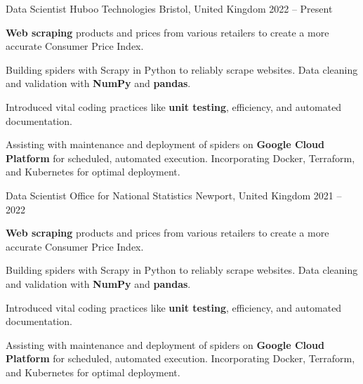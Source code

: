 
\begin{cventries}

        \cventry
        {Data Scientist} %
        {Huboo Technologies} %
        {Bristol, United Kingdom} %
        {2022 -- Present} %
        {
            \begin{cvitems} %
                \item{\textbf{Web scraping} products and prices from various retailers to create a more accurate Consumer Price Index.}
                \item{Building spiders with Scrapy in Python to reliably scrape websites. Data cleaning and validation with \textbf{NumPy} and \textbf{pandas}.}
                \item{Introduced vital coding practices like \textbf{unit testing}, efficiency, and automated documentation.}
                \item{Assisting with maintenance and deployment of spiders on \textbf{Google Cloud Platform} for scheduled, automated execution. Incorporating Docker, Terraform, and Kubernetes for optimal deployment.}
            \end{cvitems}
        }

    \cventry
        {Data Scientist} %
        {Office for National Statistics} %
        {Newport, United Kingdom} %
        {2021 -- 2022} %
        {
            \begin{cvitems} %
                \item{\textbf{Web scraping} products and prices from various retailers to create a more accurate Consumer Price Index.}
                \item{Building spiders with Scrapy in Python to reliably scrape websites. Data cleaning and validation with \textbf{NumPy} and \textbf{pandas}.}
                \item{Introduced vital coding practices like \textbf{unit testing}, efficiency, and automated documentation.}
                \item{Assisting with maintenance and deployment of spiders on \textbf{Google Cloud Platform} for scheduled, automated execution. Incorporating Docker, Terraform, and Kubernetes for optimal deployment.}
            \end{cvitems}
        }


\end{cventries}
